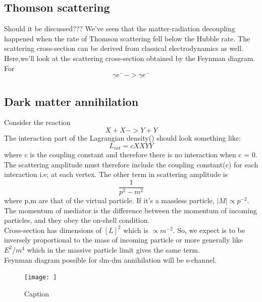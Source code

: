 \documentclass[12pt,a4paper,oneside]{book}
\begin{document}
\subsection{Thomson scattering}
Should it be discussed???
We've seen that the matter-radiation decoupling happened when the rate of Thomson scattering fell below the Hubble rate. The scattering cross-section can be derived from classical electrodynamics as well. Here,we'll look at the scattering cross-section obtained by the Feynman diagram. For
\begin{equation}
 \gamma e^{-} -> \gamma e^{-}   
\end{equation}

\subsection{Dark matter annihilation}
Consider the reaction
\begin{equation*}
    X + X -> Y +Y
\end{equation*}
The interaction part of the Lagrangian density() should look something like:
\begin{equation}
    L_{int} = c XXYY
\end{equation}
where c is the coupling constant and therefore there is no interaction when c = 0. The scattering amplitude must therefore include the coupling constant(c) for each interaction i.e; at each vertex. The other term in scattering amplitude is 
\begin{equation}
    \frac{1}{p^2-m^2}
\end{equation}
where p,m are that of the virtual particle. If it's a massless particle, $|M| \propto p^{-2}$. The momentum of mediator is the difference between the momentum of incoming particles, and they obey the on-shell condition.
\\ Cross-section has dimensions of $[L]^{2}$ which is $\propto m^{-2}$. So, we expect is to be inversely proportional to the mass of incoming particle or more generally like $E^2/m^4$ which in the massive particle limit gives the same term.
\\ Feynman diagram possible for dm-dm annihilation will be s-channel.
\begin{figure}
    \centering
    \texttt{[image: ]}
    \caption{Caption}
    \label{fig:my_label}
\end{figure}
\end{document}
